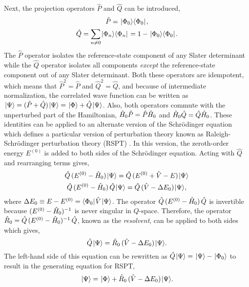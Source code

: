 \documentclass[thesis.tex]{subfiles}
\begin{document}
Next, the projection operators $\hat{P}$ and $\hat{Q}$ can be introduced,
\begin{gather}
  \hat{P} = \hspace{1pt}\lvert \Phi_{0} \rangle\langle \Phi_{0} |\hspace{1pt}, \\
  \hat{Q} = \sum_{n\neq 0}\hspace{1pt}\lvert \Phi_{n} \rangle\langle \Phi_{n} |\hspace{1pt} = 1 - \hspace{1pt}\lvert \Phi_{0} \rangle\langle \Phi_{0} |\hspace{1pt}.
\end{gather}
The $\hat{P}$ operator isolates the reference-state component of any Slater determinant while the $\hat{Q}$ operator isolates all components \textit{except} the reference-state component out of any Slater determinant.  Both these operators are idempotent, which means that $\hat{P}^{2} = \hat{P}$ and $\hat{Q}^{2} = \hat{Q}$, and because of intermediate normalization, the correlated wave function can be written as $\hspace{1pt}\lvert \Psi \rangle = \mathop{(\hat{P} + \hat{Q})}\hspace{1pt}\lvert \Psi \rangle = \hspace{1pt}\lvert \Phi \rangle + \hat{Q}\hspace{1pt}\lvert \Psi \rangle$.  Also, both operators commute with the unperturbed part of the Hamiltonian, $\hat{H}\hspace{-1pt}_{0}\hat{P} = \hat{P}\hat{H}\hspace{-1pt}_{0}$ and $\hat{H}\hspace{-1pt}_{0}\hat{Q} = \hat{Q}\hat{H}\hspace{-1pt}_{0}$.  These identities can be applied to an alternate version of the Schr\"{o}dinger equation which defines a particular version of perturbation theory known as Raleigh-Schr\"{o}dinger perturbation theory (RSPT) \cite{RAYLEIGH1894,SCHRODINGER1926}. In this version, the zeroth-order energy $E^{(0)}$ is added to both sides of the Schr\"{o}dinger equation.  Acting with $\hat{Q}$ and rearranging terms gives,
\begin{gather}
  \hat{Q}\mathop{(E^{(0)} - \hat{H}\hspace{-1pt}_{0})}\hspace{1pt}\lvert \Psi \rangle = \hat{Q}\mathop{(E^{(0)} + \hat{V} - E)}\hspace{1pt}\lvert \Psi \rangle \notag \\
  \hat{Q}\mathop{(E^{(0)} - \hat{H}\hspace{-1pt}_{0})}\hat{Q}\hspace{1pt}\lvert \Psi \rangle = \hat{Q}\mathop{(\hat{V} - \Delta E_{0})}\hspace{1pt}\lvert \Psi \rangle,
\end{gather}
where $\Delta E_{0} \equiv E - E^{(0)} = \langle \Phi_{0} |\hspace{1pt}\hat{V}\hspace{1pt}\lvert \Psi \rangle$.  The operator $\hat{Q}\mathop{(E^{(0)} - \hat{H}\hspace{-1pt}_{0})}\hat{Q}$ is invertible because $\mathop{(E^{(0)} - \hat{H}\hspace{-1pt}_{0})^{-1}}$ is never singular in $Q$-space.  Therefore, the operator $\hat{R}_{0} = \hat{Q}\mathop{(E^{(0)} - \hat{H}\hspace{-1pt}_{0})^{-1}}\hat{Q}$, known as the \textit{resolvent}, can be applied to both sides which gives,
\begin{equation}
  \hat{Q}\hspace{1pt}\lvert \Psi \rangle = \hat{R}_{0}\mathop{(\hat{V} - \Delta E_{0})}\hspace{1pt}\lvert \Psi \rangle.
\end{equation}
The left-hand side of this equation can be rewritten as $\hat{Q}\hspace{1pt}\lvert \Psi \rangle = \hspace{1pt}\lvert \Psi \rangle - \hspace{1pt}\lvert \Phi_{0} \rangle$ to result in the generating equation for RSPT,
\begin{equation} \label{eq:MBPT_Q}
  \hspace{1pt}\lvert \Psi \rangle = \hspace{1pt}\lvert \Phi \rangle + \hat{R}_{0}\mathop{(\hat{V} - \Delta E_{0})}\hspace{1pt}\lvert \Psi \rangle.
\end{equation}
\end{document}
